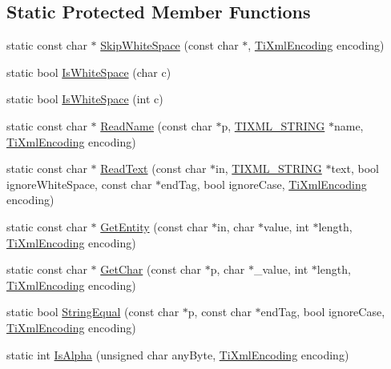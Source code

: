 \subsection*{Static Protected Member Functions}
\begin{DoxyCompactItemize}
\item 
static const char $\ast$ \hyperlink{class_ti_xml_base_ac0c3d66d8a9e6996a1fa016275e16875}{Skip\+White\+Space} (const char $\ast$, \hyperlink{tinyxml_8h_a88d51847a13ee0f4b4d320d03d2c4d96}{Ti\+Xml\+Encoding} encoding)
\item 
static bool \hyperlink{class_ti_xml_base_af56296d561c0bab4bc8e198cdcf5c48e}{Is\+White\+Space} (char c)
\item 
static bool \hyperlink{class_ti_xml_base_a3de391ea9f4c4a8aa10d04480b048795}{Is\+White\+Space} (int c)
\item 
static const char $\ast$ \hyperlink{class_ti_xml_base_a1c21a6ab5f7b503acd91f35f183734b3}{Read\+Name} (const char $\ast$p, \hyperlink{tinyxml_8h_a92bada05fd84d9a0c9a5bbe53de26887}{T\+I\+X\+M\+L\+\_\+\+S\+T\+R\+I\+N\+G} $\ast$name, \hyperlink{tinyxml_8h_a88d51847a13ee0f4b4d320d03d2c4d96}{Ti\+Xml\+Encoding} encoding)
\item 
static const char $\ast$ \hyperlink{class_ti_xml_base_aa646c74921aa33156968b802bbf5566e}{Read\+Text} (const char $\ast$in, \hyperlink{tinyxml_8h_a92bada05fd84d9a0c9a5bbe53de26887}{T\+I\+X\+M\+L\+\_\+\+S\+T\+R\+I\+N\+G} $\ast$text, bool ignore\+White\+Space, const char $\ast$end\+Tag, bool ignore\+Case, \hyperlink{tinyxml_8h_a88d51847a13ee0f4b4d320d03d2c4d96}{Ti\+Xml\+Encoding} encoding)
\item 
static const char $\ast$ \hyperlink{class_ti_xml_base_ac5c08bf3deffcda0bf8ce2958372b584}{Get\+Entity} (const char $\ast$in, char $\ast$value, int $\ast$length, \hyperlink{tinyxml_8h_a88d51847a13ee0f4b4d320d03d2c4d96}{Ti\+Xml\+Encoding} encoding)
\item 
static const char $\ast$ \hyperlink{class_ti_xml_base_a5b0fde72d6f662ae1fd6303195d2159b}{Get\+Char} (const char $\ast$p, char $\ast$\+\_\+value, int $\ast$length, \hyperlink{tinyxml_8h_a88d51847a13ee0f4b4d320d03d2c4d96}{Ti\+Xml\+Encoding} encoding)
\item 
static bool \hyperlink{class_ti_xml_base_a51631e6986179558b9e5850723ed165a}{String\+Equal} (const char $\ast$p, const char $\ast$end\+Tag, bool ignore\+Case, \hyperlink{tinyxml_8h_a88d51847a13ee0f4b4d320d03d2c4d96}{Ti\+Xml\+Encoding} encoding)
\item 
static int \hyperlink{class_ti_xml_base_ae22522b2e8e1ac43102d16394f639fc8}{Is\+Alpha} (unsigned char any\+Byte, \hyperlink{tinyxml_8h_a88d51847a13ee0f4b4d320d03d2c4d96}{Ti\+Xml\+Encoding} encoding)

\end{DoxyCompactItemize}
